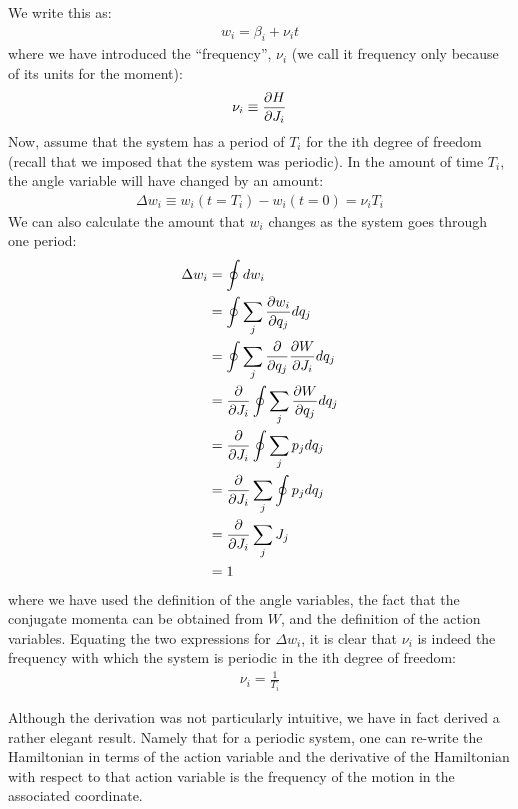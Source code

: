 We write this as:
\begin{align}
w_i=\beta_i+\nu_it
\end{align}
where we have introduced the ``frequency'', $\nu_i$ (we call it frequency only because of its units for the moment):
\begin{align}
\nu_i\equiv\frac{\partial H}{\partial J_i}
\end{align}
Now, assume that the system has a period of $T_i$ for the ith degree of freedom (recall that we imposed that the system was periodic). In the amount of time $T_i$, the angle variable will have changed by an amount:
\begin{align}
\Delta w_i \equiv w_i(t=T_i)-w_i(t=0)=\nu_iT_i
\end{align}
We can also calculate the amount that $w_i$ changes as the system goes through one period:
\begin{align}
\Delta w_i &=\oint dw_i\nonumber\\
&=\oint \sum_j \frac{\partial w_i}{\partial q_j}dq_j \nonumber\\
&=\oint \sum_j \frac{\partial }{\partial q_j}\frac{\partial W}{\partial J_i}dq_j\nonumber\\
&=\frac{\partial }{\partial J_i}\oint  \sum_j \frac{\partial W}{\partial q_j}dq_j\nonumber\\
&=\frac{\partial }{\partial J_i}\oint  \sum_j p_jdq_j\nonumber\\
&=\frac{\partial }{\partial J_i}\sum_j\oint   p_jdq_j\nonumber\\
&=\frac{\partial }{\partial J_i}\sum_jJ_j\nonumber\\
&=1
\end{align}
where we have used the definition of the angle variables, the fact that the conjugate momenta can be obtained from $W$, and the definition of the action variables. Equating the two expressions for $\Delta w_i$, it is clear that $\nu_i$ is indeed the frequency with which the system is periodic in the ith degree of freedom:
\begin{align}
\nu_i=\frac{1}{T_i}
\end{align}

Although the derivation was not particularly intuitive, we have in fact derived a rather elegant result. Namely that for a periodic system, one can re-write the Hamiltonian in terms of the action variable and the derivative of the Hamiltonian with respect to that action variable is the frequency of the motion in the associated coordinate.

